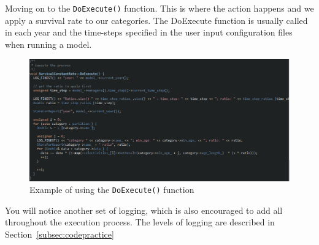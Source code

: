 Moving on to the \texttt{DoExecute()} function. This is where the action happens and we apply a survival rate to our categories. The DoExecute function is usually called in each year and the time-steps specified in the user input configuration files when running a model.

\begin{figure}[H]
	\centering
	\includegraphics[scale=0.5]{Figures/execute.png}
	\caption{Example of using the \texttt{DoExecute()} function}\label{fig:execute}
\end{figure}

You will notice another set of logging, which is also encouraged to add all throughout the execution process. The levels of logging are described in Section~\ref{subsec:codepractice}

